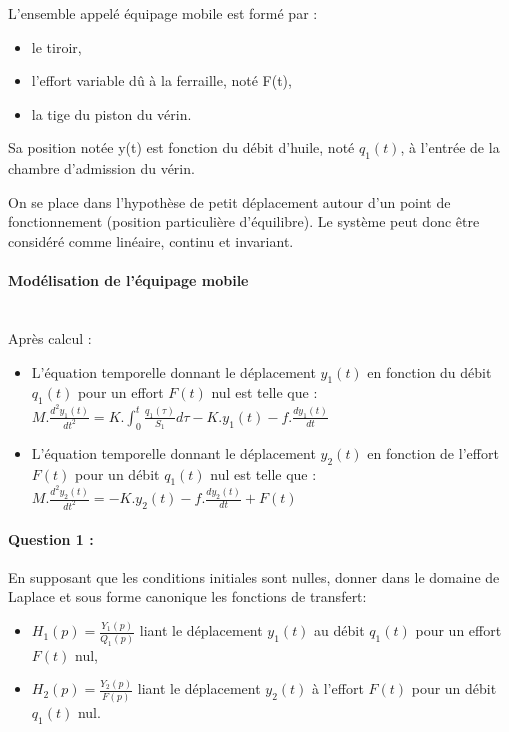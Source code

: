 L'ensemble appelé \og équipage mobile \fg est formé par :
\begin{itemize}
 \item le tiroir,
 \item l'effort variable dû à la ferraille, noté F(t),
 \item la tige du piston du vérin.
\end{itemize}

Sa position notée y(t) est fonction du débit d'huile, noté $q_1(t)$, à l'entrée de la chambre d'admission du vérin.

On se place dans l'hypothèse de petit déplacement autour d'un point de fonctionnement (position particulière d'équilibre). Le système peut donc être considéré comme linéaire, continu et invariant.

\newpage

\paragraph{Modélisation de l'équipage mobile} ~\ \\

Après calcul :
\begin{itemize}
 \item L'équation temporelle donnant le déplacement $y_1(t)$ en fonction du débit $q_1(t)$ pour un effort $F(t)$ nul est telle que : 
 $M.\frac{d^2y_1(t)}{dt^2}=K.\int_{0}^{t} \frac{q_1(\tau)}{S_1}d\tau-K.y_1(t)-f.\frac{dy_1(t)}{dt}$
 \item L'équation temporelle donnant le déplacement $y_2(t)$ en fonction de l'effort $F(t)$ pour un débit $q_1(t)$ nul est telle que :
 $M.\frac{d^2y_2(t)}{dt^2}=-K.y_2(t)-f.\frac{dy_2(t)}{dt}+F(t)$
\end{itemize}

\paragraph{Question 1 :} En supposant que les conditions initiales sont nulles, donner dans le domaine de Laplace et sous forme canonique les fonctions de transfert:

\begin{itemize}
 \item $H_1(p)=\frac{Y_1(p)}{Q_1(p)}$ liant le déplacement $y_1(t)$ au débit $q_1(t)$ pour un effort $F(t)$ nul,
 \item $H_2(p)=\frac{Y_2(p)}{F(p)}$ liant le déplacement $y_2(t)$ à l'effort $F(t)$ pour un débit $q_1(t)$ nul.
\end{itemize}
  
